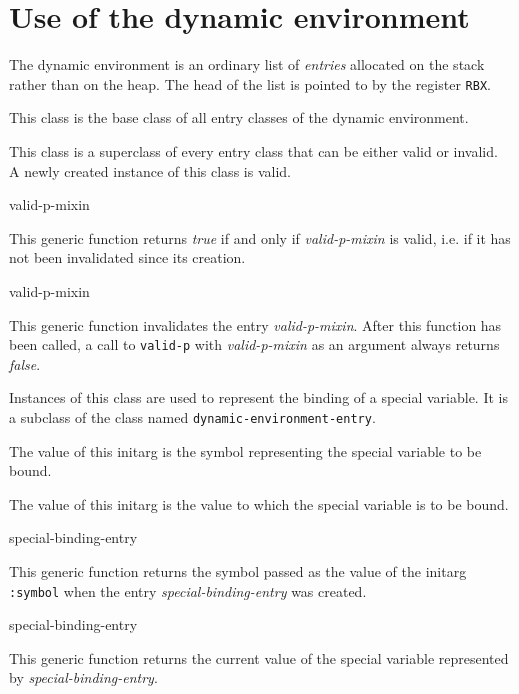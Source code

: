 \section{Use of the dynamic environment}

The dynamic environment is an ordinary list of \emph{entries}
allocated on the stack rather than on the heap.  The head of the list
is pointed to by the register \texttt{RBX}.


This class is the base class of all entry classes of the dynamic
environment.


This class is a superclass of every entry class that can be either
valid or invalid.  A newly created instance of this class is valid.

 {valid-p-mixin}

This generic function returns \textit{true} if and only if
\textit{valid-p-mixin} is valid, i.e. if it has not been invalidated
since its creation.

 {valid-p-mixin}

This generic function invalidates the entry \textit{valid-p-mixin}.
After this function has been called, a call to \texttt{valid-p} with
\textit{valid-p-mixin} as an argument always returns \textit{false}.


Instances of this class are used to represent the binding of a special
variable.  It is a subclass of the class named
\texttt{dynamic-environment-entry}.


The value of this initarg is the symbol representing the special
variable to be bound.


The value of this initarg is the value to which the special variable
is to be bound.

 {special-binding-entry}

This generic function returns the symbol passed as the value of the
initarg \texttt{:symbol} when the entry \textit{special-binding-entry}
was created.

 {special-binding-entry}

This generic function returns the current value of the special
variable represented by \textit{special-binding-entry}.

